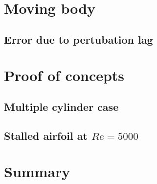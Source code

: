 \section{Moving body}

\subsection{Error due to pertubation lag}

\section{Proof of concepts}

\subsection{Multiple cylinder case}

\subsection{Stalled airfoil at $Re=5000$}

\section{Summary}